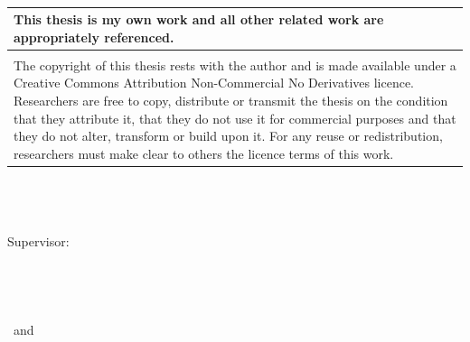 {%
    \thispagestyle{plain}~{}

    \small\onehalfspacing%
    \begin{tabular}{p{\textwidth}}
        \toprule
        This thesis is my own work and all other related work are appropriately
        referenced.
        \\ \bottomrule \\ \toprule
        The copyright of this thesis rests with the author and is made
        available under a Creative Commons Attribution Non-Commercial No
        Derivatives licence. Researchers are free to copy, distribute or
        transmit the thesis on the condition that they attribute it, that
        they do not use it for commercial purposes and that they do not
        alter, transform or build upon it. For any reuse or redistribution,
        researchers must make clear to others the licence terms of this work.
        \\ \bottomrule
    \end{tabular}
}
\hfill
\vfill
{
    \small
    \textbf{\thesisName} \\
    \textit{\thesisTitle} \\
    \thesisDate \\
    Supervisor: \thesisFirstSupervisor%
    \\[1.5em]
    \textbf{\thesisUniversity} \\
    \textit{\thesisUniversityGroup} \\
    \thesisUniversityDepartment \\
    \thesisUniversityStreetAddress \\
    \thesisUniversityPostalCode\ and \thesisUniversityCity
}
